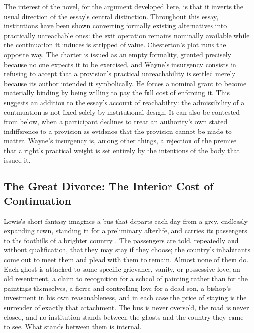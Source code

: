 \documentclass[11pt]{article}
\begin{document}
The interest of the novel, for the argument developed here, is that it inverts the usual direction of the essay's central distinction. Throughout this essay, institutions have been shown converting formally existing alternatives into practically unreachable ones: the exit operation remains nominally available while the continuation it induces is stripped of value. Chesterton's plot runs the opposite way. The charter is issued as an empty formality, granted precisely because no one expects it to be exercised, and Wayne's insurgency consists in refusing to accept that a provision's practical unreachability is settled merely because its author intended it symbolically. He forces a nominal grant to become materially binding by being willing to pay the full cost of enforcing it. This suggests an addition to the essay's account of reachability: the admissibility of a continuation is not fixed solely by institutional design. It can also be contested from below, when a participant declines to treat an authority's own stated indifference to a provision as evidence that the provision cannot be made to matter. Wayne's insurgency is, among other things, a rejection of the premise that a right's practical weight is set entirely by the intentions of the body that issued it.

\subsection{The Great Divorce: The Interior Cost of Continuation}

Lewis's short fantasy imagines a bus that departs each day from a grey, endlessly expanding town, standing in for a preliminary afterlife, and carries its passengers to the foothills of a brighter country \citep{lewis1945greatdivorce}. The passengers are told, repeatedly and without qualification, that they may stay if they choose; the country's inhabitants come out to meet them and plead with them to remain. Almost none of them do. Each ghost is attached to some specific grievance, vanity, or possessive love, an old resentment, a claim to recognition for a school of painting rather than for the paintings themselves, a fierce and controlling love for a dead son, a bishop's investment in his own reasonableness, and in each case the price of staying is the surrender of exactly that attachment. The bus is never oversold, the road is never closed, and no institution stands between the ghosts and the country they came to see. What stands between them is internal.
\end{document}
